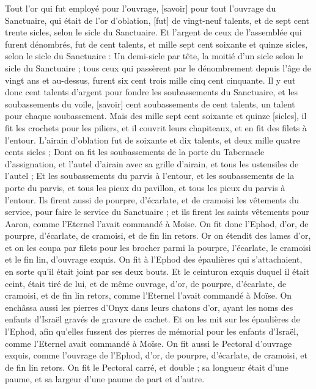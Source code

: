 \begin{multicols}{2}
Tout l'or qui fut employé pour l'ouvrage, [savoir] pour tout l'ouvrage du Sanctuaire, qui était de l'or d'oblation, [fut] de vingt-neuf talents, et de sept cent trente sicles, selon le sicle du Sanctuaire.
Et l'argent de ceux de l'assemblée qui furent dénombrés, fut de cent talents, et mille sept cent soixante et quinze sicles, selon le sicle du Sanctuaire :
Un demi-sicle par tête, la moitié d'un sicle selon le sicle du Sanctuaire ; tous ceux qui passèrent par le dénombrement depuis l'âge de vingt ans et au-dessus, furent six cent trois mille cinq cent cinquante.
Il y eut donc cent talents d'argent pour fondre les soubassements du Sanctuaire, et les soubassements du voile, [savoir] cent soubassements de cent talents, un talent pour chaque soubassement.
Mais des mille sept cent soixante et quinze [sicles], il fit les crochets pour les piliers, et il couvrit leurs chapiteaux, et en fit des filets à l’entour.
L'airain d'oblation fut de soixante et dix talents, et deux mille quatre cents sicles ;
Dont on fit les soubassements de la porte du Tabernacle d'assignation, et l'autel d'airain avec sa grille d'airain, et tous les ustensiles de l'autel ;
Et les soubassements du parvis à l’entour, et les soubassements de la porte du parvis, et tous les pieux du pavillon, et tous les pieux du parvis à l’entour.
\VerseOne{}Ils firent aussi de pourpre, d'écarlate, et de cramoisi les vêtements du service, pour faire le service du Sanctuaire ; et ils firent les saints vêtements pour Aaron, comme l'Eternel l'avait commandé à Moïse.
On fit donc l'Ephod, d'or, de pourpre, d'écarlate, de cramoisi, et de fin lin retors.
Or on étendit des lames d'or, et on les coupa par filets pour les brocher parmi la pourpre, l'écarlate, le cramoisi et le fin lin, d'ouvrage exquis.
On fit à l'Ephod des épaulières qui s'attachaient, en sorte qu'il était joint par ses deux bouts.
Et le ceinturon exquis duquel il était ceint, était tiré de lui, et de même ouvrage, d'or, de pourpre, d'écarlate, de cramoisi, et de fin lin retors, comme l'Eternel l'avait commandé à Moïse.
On enchâssa aussi les pierres d'Onyx dans leurs chatons d'or, ayant les noms des enfants d'Israël gravés de gravure de cachet.
Et on les mit sur les épaulières de l'Ephod, afin qu'elles fussent des pierres de mémorial pour les enfants d'Israël, comme l'Eternel avait commandé à Moïse.
On fit aussi le Pectoral d'ouvrage exquis, comme l'ouvrage de l'Ephod, d'or, de pourpre, d'écarlate, de cramoisi, et de fin lin retors.
On fit le Pectoral carré, et double ; sa longueur était d'une paume, et sa largeur d'une paume de part et d'autre.

\end{multicols}
